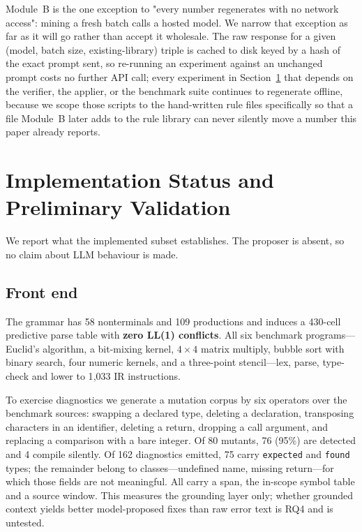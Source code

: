 \documentclass[conference]{IEEEtran}
\begin{document}
Module~B is the one exception to "every number regenerates with no network
access": mining a fresh batch calls a hosted model. We narrow that exception
as far as it will go rather than accept it wholesale. The raw response for a
given (model, batch size, existing-library) triple is cached to disk keyed by
a hash of the exact prompt sent, so re-running an experiment against an
unchanged prompt costs no further API call; every experiment in
Section~\ref{sec:status} that depends on the verifier, the applier, or the
benchmark suite continues to regenerate offline, because we scope those
scripts to the hand-written rule files specifically so that a file Module~B
later adds to the rule library can never silently move a number this paper
already reports.

\section{Implementation Status and Preliminary Validation}
\label{sec:status}

We report what the implemented subset establishes. The proposer is absent, so
no claim about LLM behaviour is made.

\subsection{Front end}

The grammar has 58 nonterminals and 109 productions and induces a 430-cell
predictive parse table with \textbf{zero LL(1) conflicts}. All six benchmark
programs---Euclid's algorithm, a bit-mixing kernel, $4\times4$ matrix multiply,
bubble sort with binary search, four numeric kernels, and a three-point
stencil---lex, parse, type-check and lower to 1{,}033 IR instructions.

To exercise diagnostics we generate a mutation corpus by six operators over the
benchmark sources: swapping a declared type, deleting a declaration,
transposing characters in an identifier, deleting a return, dropping a call
argument, and replacing a comparison with a bare integer. Of 80 mutants, 76
(95\%) are detected and 4 compile silently. Of 162 diagnostics emitted, 75
carry \texttt{expected} and \texttt{found} types; the remainder belong to
classes---undefined name, missing return---for which those fields are not
meaningful. All carry a span, the in-scope symbol table and a source window.
This measures the grounding layer only; whether grounded context yields better
model-proposed fixes than raw error text is RQ4 and is untested.
\end{document}
